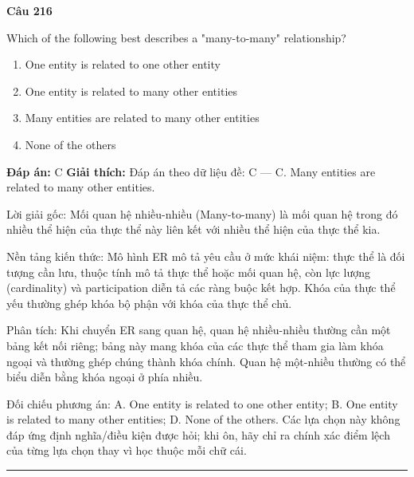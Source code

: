 \documentclass[11pt,a4paper]{article}
\newenvironment{question}[1]{%
  \par\vspace{1em}\noindent\textbf{\large Câu #1}\par\vspace{0.4em}
}{%
  \par\vspace{1em}\hrule\vspace{0.6em}
}
\newenvironment{choices}{%
  \begin{enumerate}[label=\textbf{\Alph*.},leftmargin=2.2em,itemsep=2pt,topsep=3pt]
}{%
  \end{enumerate}
}
\newcommand{\choice}{\item}
\begin{document}
\begin{question}{216}
Which of the following best describes a "many-to-many" relationship?
\begin{choices}
\choice One entity is related to one other entity
\choice One entity is related to many other entities
\choice Many entities are related to many other entities
\choice None of the others
\end{choices}
\textbf{Đáp án:} C
\textbf{Giải thích:} Đáp án theo dữ liệu đề: C — C. Many entities are related to many other entities.

Lời giải gốc: Mối quan hệ nhiều-nhiều (Many-to-many) là mối quan hệ trong đó nhiều thể hiện của thực thể này liên kết với nhiều thể hiện của thực thể kia.

Nền tảng kiến thức: Mô hình ER mô tả yêu cầu ở mức khái niệm: thực thể là đối tượng cần lưu, thuộc tính mô tả thực thể hoặc mối quan hệ, còn lực lượng (cardinality) và participation diễn tả các ràng buộc kết hợp. Khóa của thực thể yếu thường ghép khóa bộ phận với khóa của thực thể chủ.

Phân tích: Khi chuyển ER sang quan hệ, quan hệ nhiều-nhiều thường cần một bảng kết nối riêng; bảng này mang khóa của các thực thể tham gia làm khóa ngoại và thường ghép chúng thành khóa chính. Quan hệ một-nhiều thường có thể biểu diễn bằng khóa ngoại ở phía nhiều.

Đối chiếu phương án: A. One entity is related to one other entity; B. One entity is related to many other entities; D. None of the others. Các lựa chọn này không đáp ứng định nghĩa/điều kiện được hỏi; khi ôn, hãy chỉ ra chính xác điểm lệch của từng lựa chọn thay vì học thuộc mỗi chữ cái.
\end{question}
\end{document}
